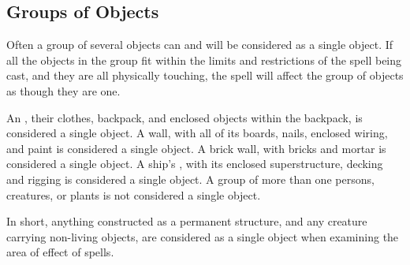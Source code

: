 \begin{multicols*}{2}
\section{Groups of Objects}
Often a group of several objects can and will be considered as a single object. If all the objects in the group fit within the limits and restrictions of the spell being cast, and they are all physically touching, the spell will affect the group of objects as though they are one. 

An , their clothes, backpack, and enclosed objects within the backpack, is considered a single object. A wall, with all of its boards, nails, enclosed wiring, and paint is considered a single object. A brick wall, with bricks and mortar is considered a single object. A ship's , with its enclosed superstructure, decking and rigging is considered a single object. A group of more than one persons, creatures, or plants is not considered a single object.

In short, anything constructed as a permanent structure, and any creature carrying non-living objects, are considered as a single object when examining the area of effect of spells.
\end{multicols*}